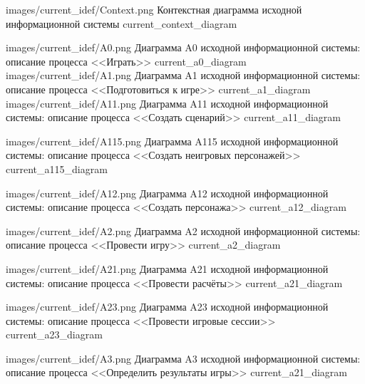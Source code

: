             {images/current_idef/Context.png}
            {Контекстная диаграмма исходной информационной системы}
            {current_context_diagram}

             {images/current_idef/A0.png}
             {Диаграмма A0 исходной информационной системы: описание процесса <<Играть>>}
             {current_a0_diagram}
             {images/current_idef/A1.png}
             {Диаграмма A1 исходной информационной системы: описание процесса <<Подготовиться к игре>>}
             {current_a1_diagram}
            {images/current_idef/A11.png}
            {Диаграмма A11 исходной информационной системы: описание процесса <<Создать сценарий>>}
            {current_a11_diagram}

            {images/current_idef/A115.png}
            {Диаграмма A115 исходной информационной системы: описание процесса <<Создать неигровых персонажей>>}
            {current_a115_diagram}

            {images/current_idef/A12.png}
            {Диаграмма A12 исходной информационной системы: описание процесса <<Создать персонажа>>}
            {current_a12_diagram}

             {images/current_idef/A2.png}
             {Диаграмма A2 исходной информационной системы: описание процесса <<Провести игру>>}
             {current_a2_diagram}

             {images/current_idef/A21.png}
             {Диаграмма A21 исходной информационной системы: описание процесса <<Провести расчёты>>}
             {current_a21_diagram}

             {images/current_idef/A23.png}
             {Диаграмма A23 исходной информационной системы: описание процесса <<Провести игровые сессии>>}
             {current_a23_diagram}

             {images/current_idef/A3.png}
             {Диаграмма A3 исходной информационной системы: описание процесса <<Определить результаты игры>>}
             {current_a21_diagram}
